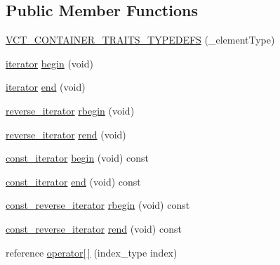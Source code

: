 \subsection*{Public Member Functions}
\begin{DoxyCompactItemize}
\item 
\hyperlink{classvct_dynamic_vector_base_a002c5a49abe5a7d4f4480c882b63739d}{V\-C\-T\-\_\-\-C\-O\-N\-T\-A\-I\-N\-E\-R\-\_\-\-T\-R\-A\-I\-T\-S\-\_\-\-T\-Y\-P\-E\-D\-E\-F\-S} (\-\_\-element\-Type)
\item 
\hyperlink{classvct_dynamic_const_vector_base_aaed13bc31a9ee4971bad765ba5c2c811}{iterator} \hyperlink{classvct_dynamic_vector_base_ab26ac6919f9cbbfa2df0bc60b4c37212}{begin} (void)
\item 
\hyperlink{classvct_dynamic_const_vector_base_aaed13bc31a9ee4971bad765ba5c2c811}{iterator} \hyperlink{classvct_dynamic_vector_base_a0db66404e972562ed8952947248c4be4}{end} (void)
\item 
\hyperlink{classvct_dynamic_const_vector_base_af10d167259519ceeca9276da3435e193}{reverse\-\_\-iterator} \hyperlink{classvct_dynamic_vector_base_a051fd4d8e7a0831cf8e20c3228a24b9f}{rbegin} (void)
\item 
\hyperlink{classvct_dynamic_const_vector_base_af10d167259519ceeca9276da3435e193}{reverse\-\_\-iterator} \hyperlink{classvct_dynamic_vector_base_ab2704e8e0ca57fb063515cf17424cbb5}{rend} (void)
\item 
\hyperlink{classvct_dynamic_const_vector_base_ad04d1e54698ac5e244d15dfacd0e603c}{const\-\_\-iterator} \hyperlink{classvct_dynamic_vector_base_ac76838f129302af0897b00aa7fc6e369}{begin} (void) const 
\item 
\hyperlink{classvct_dynamic_const_vector_base_ad04d1e54698ac5e244d15dfacd0e603c}{const\-\_\-iterator} \hyperlink{classvct_dynamic_vector_base_a98e165c1af677afb6dfc91d22cb7b422}{end} (void) const 
\item 
\hyperlink{classvct_dynamic_const_vector_base_aadfcc99550b376238b6c793c17d19ca5}{const\-\_\-reverse\-\_\-iterator} \hyperlink{classvct_dynamic_vector_base_a328e7ffa7b9da097998f9d279fc43c2f}{rbegin} (void) const 
\item 
\hyperlink{classvct_dynamic_const_vector_base_aadfcc99550b376238b6c793c17d19ca5}{const\-\_\-reverse\-\_\-iterator} \hyperlink{classvct_dynamic_vector_base_ab997e462e868b68f456fde3b6a110ac6}{rend} (void) const 
\item 
reference \hyperlink{classvct_dynamic_vector_base_a409f03ced63e5f2374ec9847754ab034}{operator\mbox{[}$\,$\mbox{]}} (index\-\_\-type index)

\end{DoxyCompactItemize}
